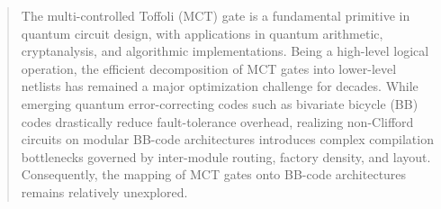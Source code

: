 \documentclass[sigconf]{acmart}
\begin{document}
\renewcommand{\shortauthors}{Basu Bhaumik et al.}


\begin{abstract}

The multi-controlled Toffoli (MCT) gate is a fundamental primitive in quantum circuit design, with applications in quantum arithmetic, cryptanalysis, and algorithmic implementations. Being a high-level logical operation, the efficient decomposition of MCT gates into lower-level netlists has remained a major optimization challenge for decades. While emerging quantum error-correcting codes such as bivariate bicycle (BB) codes drastically reduce fault-tolerance overhead, realizing non-Clifford circuits on modular BB-code architectures introduces complex compilation bottlenecks governed by inter-module routing, factory density, and layout. Consequently, the mapping of MCT gates onto BB-code architectures remains relatively unexplored.


\end{abstract}
\end{document}

